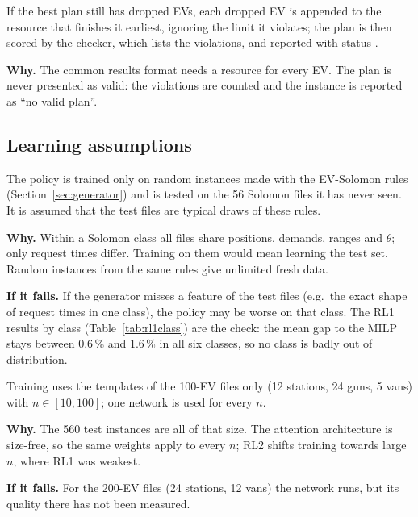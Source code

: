 \begin{assumption}\label{as:complete}
If the best plan still has dropped EVs, each dropped EV is appended to the resource that finishes it earliest, ignoring the limit it violates; the plan is then scored by the checker, which lists the violations, and reported with status .

\textbf{Why.} The common results format needs a resource for every EV. The plan is never presented as valid: the violations are counted and the instance is reported as ``no valid plan''.
\end{assumption}

\subsection{Learning assumptions}

\begin{assumption}\label{as:dist}
The policy is trained only on random instances made with the EV-Solomon rules (Section~\ref{sec:generator}) and is tested on the 56 Solomon files it has never seen. It is assumed that the test files are typical draws of these rules.

\textbf{Why.} Within a Solomon class all files share positions, demands, ranges and $\theta$; only request times differ. Training on them would mean learning the test set. Random instances from the same rules give unlimited fresh data.

\textbf{If it fails.} If the generator misses a feature of the test files (e.g.\ the exact shape of request times in one class), the policy may be worse on that class. The RL1 results by class (Table~\ref{tab:rl1class}) are the check: the mean gap to the MILP stays between 0.6\,\% and 1.6\,\% in all six classes, so no class is badly out of distribution.
\end{assumption}

\begin{assumption}\label{as:size}
Training uses the templates of the 100-EV files only (12 stations, 24 guns, 5 vans) with $n\in[10,100]$; one network is used for every $n$.

\textbf{Why.} The 560 test instances are all of that size. The attention architecture is size-free, so the same weights apply to every $n$; RL2 shifts training towards large $n$, where RL1 was weakest.

\textbf{If it fails.} For the 200-EV files (24 stations, 12 vans) the network runs, but its quality there has not been measured.
\end{assumption}

